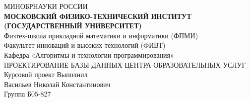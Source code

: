 \documentclass[a4paper]{article}
\begin{document}
 
\begin{center}
\LARGE{МИНОБРНАУКИ РОССИИ}\\
\Large{\textbf{МОСКОВСКИЙ ФИЗИКО-ТЕХНИЧЕСКИЙ ИНСТИТУТ}}\\
\Large{\textbf{(ГОСУДАРСТВЕННЫЙ УНИВЕРСИТЕТ)}}\\
\vspace{\baselineskip}
\large{Физтех-школа прикладной математики и информатики (ФПМИ)}\\
\large{Факультет инноваций и высоких технологий (ФИВТ)}\\
\large{Кафедра «Алгоритмы и технологии программирования»}\\

\vspace{\baselineskip}
\vspace{\baselineskip}
\vspace{\baselineskip}
\vspace{\baselineskip}
\vspace{\baselineskip}
\vspace{\baselineskip}
\vspace{\baselineskip}
\vspace{\baselineskip}
\vspace{\baselineskip}
\vspace{\baselineskip}
\vspace{\baselineskip}
\vspace{\baselineskip}
\vspace{\baselineskip}
\vspace{\baselineskip}
\vspace{\baselineskip}
\vspace{\baselineskip}
\vspace{\baselineskip}
\Huge{ПРОЕКТИРОВАНИЕ БАЗЫ ДАННЫХ ЦЕНТРА ОБРАЗОВАТЕЛЬНЫХ УСЛУГ}\\
\vspace{\baselineskip}
\large{Курсовой проект}
\vspace{\baselineskip}
\large{Выполнил}\\
\large{Васильев Николай Константинович}\\
\large{Группа Б05-827}\\
\vspace{\baselineskip}
\vspace{\baselineskip}
\end{center}
\vspace{\baselineskip}
\vspace{\baselineskip}
\end{document}
